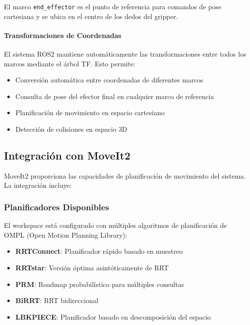 El marco \texttt{end\_effector} es el punto de referencia para comandos de pose cartesiana y se ubica en el centro de los dedos del gripper.

\paragraph{Transformaciones de Coordenadas}

El sistema ROS2 mantiene automáticamente las transformaciones entre todos los marcos mediante el árbol TF. Esto permite:

\begin{itemize}
    \item Conversión automática entre coordenadas de diferentes marcos
    \item Consulta de pose del efector final en cualquier marco de referencia
    \item Planificación de movimiento en espacio cartesiano
    \item Detección de colisiones en espacio 3D
\end{itemize}

\subsection{Integración con MoveIt2}

MoveIt2 proporciona las capacidades de planificación de movimiento del sistema. La integración incluye:

\subsubsection{Planificadores Disponibles}

El workspace está configurado con múltiples algoritmos de planificación de OMPL (Open Motion Planning Library):

\begin{itemize}
    \item \textbf{RRTConnect}: Planificador rápido basado en muestreo
    \item \textbf{RRTstar}: Versión óptima asintóticamente de RRT
    \item \textbf{PRM}: Roadmap probabilístico para múltiples consultas
    \item \textbf{BiRRT}: RRT bidireccional
    \item \textbf{LBKPIECE}: Planificador basado en descomposición del espacio
\end{itemize}

